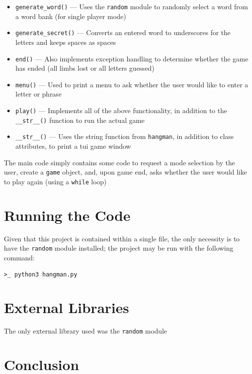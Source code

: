 \documentclass[
	letterpaper, %
	10pt, %
]{CSUniSchoolLabReport}
\begin{document}
\begin{itemize}
  \item \texttt{generate\_word()} — Uses the \texttt{random} module to randomly select a word from a word bank (for single player mode)

  \item \texttt{generate\_secret()} — Converts an entered word to underscores for the letters and keeps spaces as spaces

  \item \texttt{end()} — Also implements exception handling to determine whether the game has ended (all limbs lost or all letters guessed)

  \item \texttt{menu()} — Used to print a menu to ask whether the user would like to enter a letter or phrase

  \item \texttt{play()} — Implements all of the above functionality, in addition to the \texttt{\_\_str\_\_()} function to run the actual game

  \item \texttt{\_\_str\_\_()} — Uses the string function from \texttt{hangman}, in addition to class attributes, to print a tui game window

\end{itemize}

The main code simply contains some code to request a mode selection by the user, create a \texttt{game} object, and, upon game end, asks whether the user would like to play again (using a \texttt{while} loop)

\section{Running the Code}

Given that this project is contained within a single file, the only necessity is to have the \texttt{random} module installed; the project may be run with the following command:

\begin{center}
  \texttt{>\_ python3 hangman.py}
\end{center}

\section{External Libraries}

The only external library used was the \texttt{random} module

\section{Conclusion}
\end{document}
